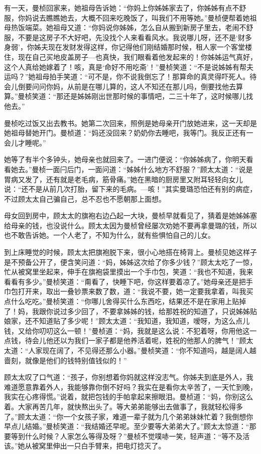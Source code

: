 \par 有一天，曼桢回家来，她祖母告诉她：“你妈上你姊姊家去了，你姊姊有点不舒服，你妈说去瞧瞧她去，大概不回来吃晚饭了，叫我们不用等她。”曼桢便帮着她祖母热饭端菜。她祖母又道：“你妈说你姊姊，怎么自从搬到新房子里去，老闹不舒服，不要是这房子不大好吧，先没找个人来看看风水。我说哪儿呀，还不是‘财多身弱’，你姊夫现在发财发得这样，你记得他们刚结婚那时候，租人家一个客堂楼住，现在自己买地皮盖房子—也真快，我们眼看着他发起来的！你姊姊运气真好，这个人真给她嫁着了！咳，真是‘命好不用吃斋’！”曼桢笑道：“不是说姊姊有帮夫运吗？”她祖母拍手笑道：“可不是，你不说我倒忘了！那算命的真灵得吓死人。待会儿倒要问问你妈，从前是在哪儿算的，这人不知还在那儿吗，倒要找他去算算。”曼桢笑道：“那还是姊姊刚出世那时候的事情吧，二三十年了，这时候哪儿找他去。”
\par 曼桢吃过饭又出去教书。她第二次回来，照例是她母亲开门放她进来，这一天却是她祖母替她开门。曼桢道：“妈还没回来？奶奶你去睡吧，我等门。我反正还有一会儿才睡呢。”
\par 她等了有半个多钟头，她母亲也就回来了。一进门便说：“你姊姊病了，你明天看看她去。”曼桢一面闩后门，一面问道：“姊姊什么地方不舒服？”顾太太道：“说是胃病又发了，还有就是老毛病，筋骨痛。”她在黑暗的厨房里又附耳轻轻向女儿说：“还不是从前几次打胎，留下来的毛病。—咳！”其实曼璐恐怕还有别的病症，不过顾太太自己骗自己，总不忍也不愿朝那上面想。
\par 母女回到房中，顾太太的旗袍右边凸起一大块，曼桢早就看见了，猜着是她姊姊塞给母亲的钱，也没说什么。顾太太因为曼桢曾经屡次劝她不要再拿曼璐的钱，所以也不敢告诉她。一个人老了，不知为什么，就有些惧怕自己的儿女。
\par 到上床睡觉的时候，顾太太把旗袍脱下来，很小心地搭在椅背上。曼桢见她这样子是不预备公开了，便含笑问道：“妈，姊姊这次给了你多少钱？”顾太太吃了一惊，忙从被窝里坐起来，伸手在旗袍袋里摸出一个手巾包，笑道：“我也不知道，我来看看有多少。”曼桢笑道：“甭看了，快睡下吧，你这样要着凉了。”她母亲还是把手巾包打开来，取出一叠钞票来数了数，道：“我说不要，她一定要我拿着，叫我买点什么吃吃。”曼桢笑道：“你哪儿舍得买什么东西吃，结果还不是在家用上贴掉了！妈，我跟你说过多少回了，不要拿姊姊的钱，给那姓祝的知道了，只说姊姊贴娘家，还不知道贴了多少呢！”顾太太道：“我知道，我知道，嗳呀，为这么点儿钱，又给你叨叨这么一顿！”曼桢道：“妈，我就是这么说：不犯着呀，你用他这一点钱，待会儿他还以为我们一家子都是他养活着呢，姓祝的他那人的脾气！”顾太太道：“人家现在阔了，不见得还那么小器。”曼桢笑道：“你不知道吗，越是阔人越啬刻，就像是他们的钱特别值钱似的！”
\par 顾太太叹了口气道：“孩子，你别想着你妈就这样没志气。你姊夫到底是外人，我难道愿意靠着外人，我能够靠你倒不好吗？我实在是看你太辛苦了，一天忙到晚，我实在心疼得慌。”说着，就把包钱的手帕拿起来擦眼泪。曼桢道：“妈，你别这么着。大家再苦几年，就快熬出头了。等大弟弟能够出去做事了，我就轻松得多了。”顾太太道：“你一个女孩子家，难道一辈子就为几个弟弟妹妹忙着？我倒想你早点儿结婚。”曼桢笑道：“我结婚还早呢。至少要等大弟弟大了。”顾太太惊道：“那要等到什么时候？人家怎么等得及呀？”曼桢不觉噗哧一笑，轻声道：“等不及活该。”她从被窝里伸出一只白手臂来，把电灯捻灭了。
